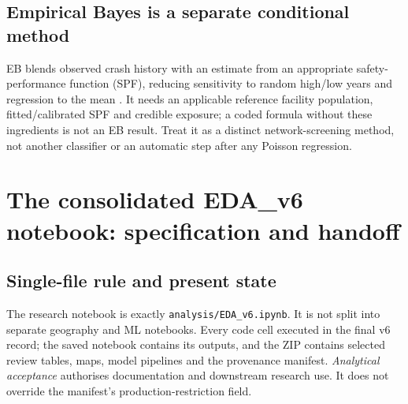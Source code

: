 \documentclass[11pt,a4paper,openany]{report}
\newcommand{\pathcode}[1]{\nolinkurl{#1}}
\begin{document}
\section{Empirical Bayes is a separate conditional method}
EB blends observed crash history with an estimate from an appropriate safety-performance function (SPF), reducing sensitivity to random high/low years and regression to the mean \cite{FHWA_EB}. It needs an applicable reference facility population, fitted/calibrated SPF and credible exposure; a coded formula without these ingredients is not an EB result. Treat it as a distinct network-screening method, not another classifier or an automatic step after any Poisson regression.

\chapter{The consolidated EDA\_v6 notebook: specification and handoff}
\section{Single-file rule and present state}
The research notebook is exactly \pathcode{analysis/EDA_v6.ipynb}. It is not split into separate geography and ML notebooks. Every code cell executed in the final v6 record; the saved notebook contains its outputs, and the ZIP contains selected review tables, maps, model pipelines and the provenance manifest. \emph{Analytical acceptance} authorises documentation and downstream research use. It does not override the manifest's production-restriction field.
\end{document}
